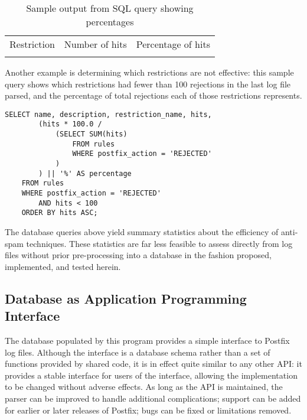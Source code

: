 

\begin{table}[ht]
    \caption{Sample output from SQL query showing percentages}
    \empty{}\label{Sample output from SQL query showing
    percentages}
    \begin{tabular}[]{lrr}
        \tableline{}
        Restriction & Number of hits & Percentage of hits \\
        \tableline{}%
        
        \tableline{}
    \end{tabular}
\end{table}


Another example is determining which restrictions are not effective: this
sample query shows which restrictions had fewer than 100 rejections in the
last log file parsed, and the percentage of total rejections each of those
restrictions represents.

\begin{verbatim}
SELECT name, description, restriction_name, hits,
        (hits * 100.0 /
            (SELECT SUM(hits)
                FROM rules
                WHERE postfix_action = 'REJECTED'
            )
        ) || '%' AS percentage
    FROM rules
    WHERE postfix_action = 'REJECTED'
        AND hits < 100
    ORDER BY hits ASC;
\end{verbatim}

The database queries above yield summary statistics about the efficiency of
anti-spam techniques.  These statistics are far less feasible to assess
directly from log files without prior pre-processing into a database in the
fashion proposed, implemented, and tested herein.

\subsection{Database as Application Programming Interface}

\label{database as API}

The database populated by this program provides a simple interface to
Postfix log files.  Although the interface is a database schema rather than
a set of functions provided by shared code, it is in effect quite similar
to any other \gls{API}: it provides a stable interface for users of the
interface, allowing the implementation to be changed without adverse
effects.  As long as the \gls{API} is maintained, the parser can be
improved to handle additional complications; support can be added for
earlier or later releases of Postfix; bugs can be fixed or limitations
removed.


